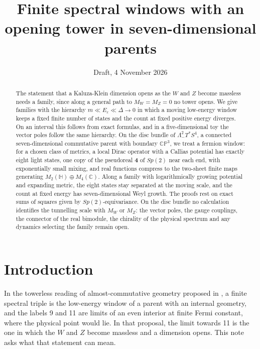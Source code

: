 \documentclass[aps,prd,reprint,onecolumn,nofootinbib,amsmath,amssymb,floatfix]{revtex4-2}
\theoremstyle{plain}
\newcommand{\C}{\mathbb C}
\renewcommand{\H}{\mathbb H}
\newcommand{\CP}{\mathbb{CP}}
\begin{document}
\title{Finite spectral windows with an opening tower in seven-dimensional parents}
\date{Draft, 4 November 2026}

\begin{abstract}
The statement that a Kaluza-Klein dimension opens as the $W$ and $Z$ become massless needs a family, since along a general path to $M_W=M_Z=0$ no tower opens. We give families with the hierarchy $m\ll E_\varepsilon\ll\Delta\to0$ in which a moving low-energy window keeps a fixed finite number of states and the count at fixed positive energy diverges. On an interval this follows from exact formulas, and in a five-dimensional toy the vector poles follow the same hierarchy. On the disc bundle of $\Lambda^2_-T^*S^4$, a connected seven-dimensional commutative parent with boundary $\CP^3$, we treat a fermion window: for a chosen class of metrics, a local Dirac operator with a Callias potential has exactly eight light states, one copy of the pseudoreal $\mathbf 4$ of $Sp(2)$ near each end, with exponentially small mixing, and real functions compress to the two-sheet finite maps generating $M_2(\H)\oplus M_4(\C)$. Along a family with logarithmically growing potential and expanding metric, the eight states stay separated at the moving scale, and the count at fixed energy has seven-dimensional Weyl growth. The proofs rest on exact sums of squares given by $Sp(2)$-equivariance. On the disc bundle no calculation identifies the tunnelling scale with $M_W$ or $M_Z$: the vector poles, the gauge couplings, the connector of the real bimodule, the chirality of the physical spectrum and any dynamics selecting the family remain open.
\end{abstract}

\maketitle

\section{Introduction}

In the towerless reading of almost-commutative geometry proposed in \cite{towerlesspaper}, a finite spectral triple is the low-energy window of a parent with an internal geometry, and the labels 9 and 11 are limits of an even interior at finite Fermi constant, where the physical point would lie. In that proposal, the limit towards 11 is the one in which the $W$ and $Z$ become massless and a dimension opens. This note asks what that statement can mean.
\end{document}
